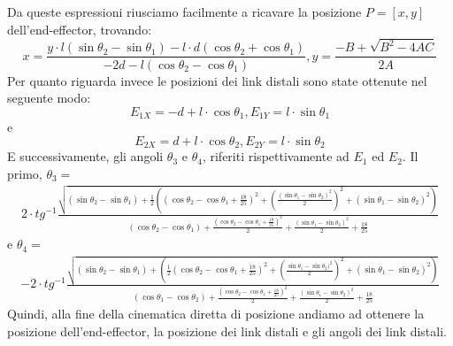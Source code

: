 Da queste espressioni riusciamo facilmente a ricavare la posizione $P = [x,y]$ dell'end-effector, trovando:
\begin{equation}
x = \frac{y\cdot l(\sin\theta_2 - \sin\theta_1)-l\cdot d(\cos\theta_2+\cos\theta_1)}{-2d-l(\cos\theta_2-\cos\theta_1)}, y = \frac{-B + \sqrt{B^2-4AC}}{2A} 
\end{equation}
Per quanto riguarda invece le posizioni dei link distali sono state ottenute nel seguente modo: 
\begin{equation*}
    E_{1X} = -d+l\cdot \cos\theta_1 , E_{1Y}=l\cdot \sin\theta_1
\end{equation*}
e
\begin{equation*}
    E_{2X} = d+ l\cdot \cos\theta_2, E_{2Y} = l\cdot \sin\theta_2
\end{equation*}
E successivamente, gli angoli $\theta_3$ e $\theta_4$, riferiti rispettivamente ad $E_1$ ed $E_2$. Il primo, $\theta_3=$
\begin{equation*}
    \begin{aligned}
    2\cdot tg^{-1}\frac{\sqrt{ (\sin\theta_2 - \sin\theta_1) + \frac{1}{2}((\cos\theta_2 - \cos\theta_1 + \frac{18}{25})^2+(\frac{(\sin\theta_1-\sin\theta_2)^2}{2})^2+(\sin\theta_1-\sin\theta_2)^2)}}{(\cos\theta_2-\cos\theta_1)+\frac{(\cos\theta_2-\cos\theta_1+\frac{18}{25})^2}{2}+\frac{(\sin\theta_1-\sin\theta_2)^2}{2}+\frac{18}{25}}
    \end{aligned}
\end{equation*}
e $\theta_4 =$
\begin{equation*}
    \begin{aligned}
    -2\cdot tg^{-1}\frac{\sqrt{(\sin\theta_2-\sin\theta_1)+(\frac{1}{2}(\cos\theta_2-\cos\theta_1+\frac{18}{25})^2+(\frac{\sin\theta_1-\sin\theta_2)^2}{2})^2+(\sin\theta_1-\sin\theta_2)^2)}}
    {(\cos\theta_1 -\cos\theta_2)+\frac{(\cos\theta_2-\cos\theta_1+\frac{18}{25})^2}{2}+\frac{(\sin\theta_1-\sin\theta_2)^2}{2}+\frac{18}{25}}
    \end{aligned}
\end{equation*}
Quindi, alla fine della cinematica diretta di posizione andiamo ad ottenere la posizione dell'end-effector, la posizione dei link distali e gli angoli dei link distali.

